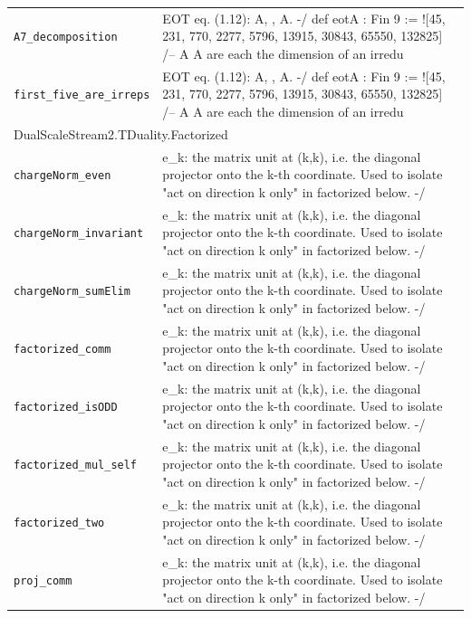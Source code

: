 \begin{longtable}{p{}p{}}
\quad\texttt{\footnotesize A7\_decomposition} & {\footnotesize EOT eq. (1.12): A, , A. -/ def eotA : Fin 9   := ![45, 231, 770, 2277, 5796, 13915, 30843, 65550, 132825] /-- A  A are each the dimension of an irredu} \\
\quad\texttt{\footnotesize first\_five\_are\_irreps} & {\footnotesize EOT eq. (1.12): A, , A. -/ def eotA : Fin 9   := ![45, 231, 770, 2277, 5796, 13915, 30843, 65550, 132825] /-- A  A are each the dimension of an irredu} \\
\multicolumn{2}{l}{\textsf{\small DualScaleStream2.TDuality.Factorized}} \\
\quad\texttt{\footnotesize chargeNorm\_even} & {\footnotesize e\_k: the matrix unit at (k,k), i.e. the diagonal projector onto the k-th coordinate. Used to isolate "act on direction k only" in factorized below. -/} \\
\quad\texttt{\footnotesize chargeNorm\_invariant} & {\footnotesize e\_k: the matrix unit at (k,k), i.e. the diagonal projector onto the k-th coordinate. Used to isolate "act on direction k only" in factorized below. -/} \\
\quad\texttt{\footnotesize chargeNorm\_sumElim} & {\footnotesize e\_k: the matrix unit at (k,k), i.e. the diagonal projector onto the k-th coordinate. Used to isolate "act on direction k only" in factorized below. -/} \\
\quad\texttt{\footnotesize factorized\_comm} & {\footnotesize e\_k: the matrix unit at (k,k), i.e. the diagonal projector onto the k-th coordinate. Used to isolate "act on direction k only" in factorized below. -/} \\
\quad\texttt{\footnotesize factorized\_isODD} & {\footnotesize e\_k: the matrix unit at (k,k), i.e. the diagonal projector onto the k-th coordinate. Used to isolate "act on direction k only" in factorized below. -/} \\
\quad\texttt{\footnotesize factorized\_mul\_self} & {\footnotesize e\_k: the matrix unit at (k,k), i.e. the diagonal projector onto the k-th coordinate. Used to isolate "act on direction k only" in factorized below. -/} \\
\quad\texttt{\footnotesize factorized\_two} & {\footnotesize e\_k: the matrix unit at (k,k), i.e. the diagonal projector onto the k-th coordinate. Used to isolate "act on direction k only" in factorized below. -/} \\
\quad\texttt{\footnotesize proj\_comm} & {\footnotesize e\_k: the matrix unit at (k,k), i.e. the diagonal projector onto the k-th coordinate. Used to isolate "act on direction k only" in factorized below. -/} \\

\end{longtable}
